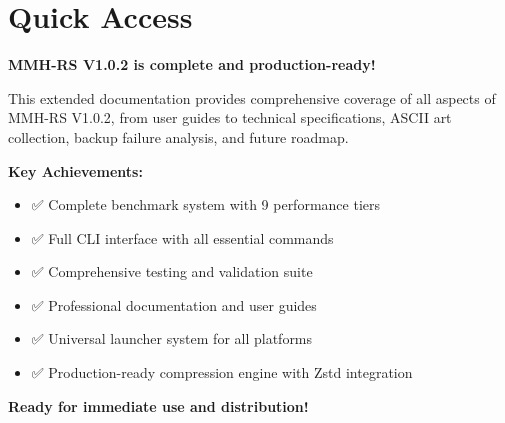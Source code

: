 \documentclass[11pt,a4paper]{article}
\begin{document}
	\section{Quick Access}
	\label{sec:quickaccess}

	\begin{center}
	\end{center}

	\begin{center}
	\end{center}

	\begin{successbox}
	\textbf{MMH-RS V1.0.2 is complete and production-ready!}

	This extended documentation provides comprehensive coverage of all aspects of MMH-RS V1.0.2, from user guides to technical specifications, ASCII art collection, backup failure analysis, and future roadmap.

	\textbf{Key Achievements:}
	\begin{itemize}
		\item ✅ Complete benchmark system with 9 performance tiers
		\item ✅ Full CLI interface with all essential commands
		\item ✅ Comprehensive testing and validation suite
		\item ✅ Professional documentation and user guides
		\item ✅ Universal launcher system for all platforms
		\item ✅ Production-ready compression engine with Zstd integration
	\end{itemize}

	\textbf{Ready for immediate use and distribution!}
	\end{successbox}
\end{document}
